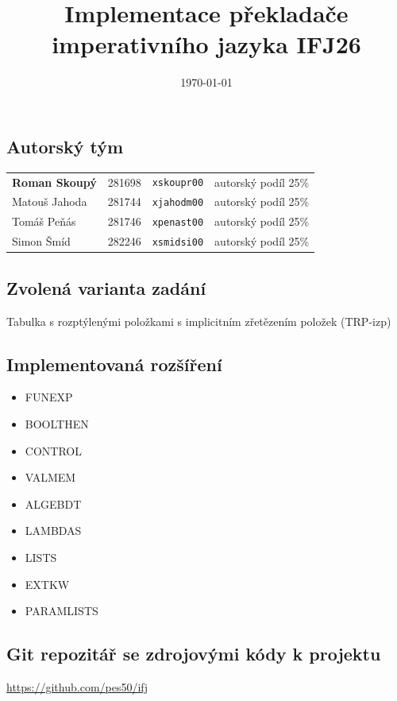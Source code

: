 \documentclass{article}
\title{\textbf{Implementace překladače \\
       imperativního jazyka IFJ26}}
\date{\today}
\begin{document}
    \maketitle
    \thispagestyle{empty}

    \subsection*{Autorský tým}
        \begin{tabular}{l l l l}
            \textbf{Roman Skoupý} & 281698 & \verb|xskoupr00| & autorský podíl 25\%\\
            Matouš Jahoda & 281744 & \verb|xjahodm00| & autorský podíl  25\%\\
            Tomáš Peňás & 281746 & \verb|xpenast00| & autorský podíl  25\%\\
            Simon Šmíd & 282246 & \verb|xsmidsi00| & autorský podíl  25\%\\
        \end{tabular}
        
    \subsection*{Zvolená varianta zadání}
        Tabulka s rozptýlenými položkami s implicitním zřetězením položek (TRP-izp)
        
    \subsection*{Implementovaná rozšíření}
        \begin{itemize}
            \item FUNEXP
            \item BOOLTHEN
            \item CONTROL
            \item VALMEM
            \item ALGEBDT
            \item LAMBDAS
            \item LISTS
            \item EXTKW
            \item PARAMLISTS
        \end{itemize}
        
    \subsection*{Git repozitář se zdrojovými kódy k projektu}
        \url{https://github.com/pes50/ifj}
        
\end{document}
